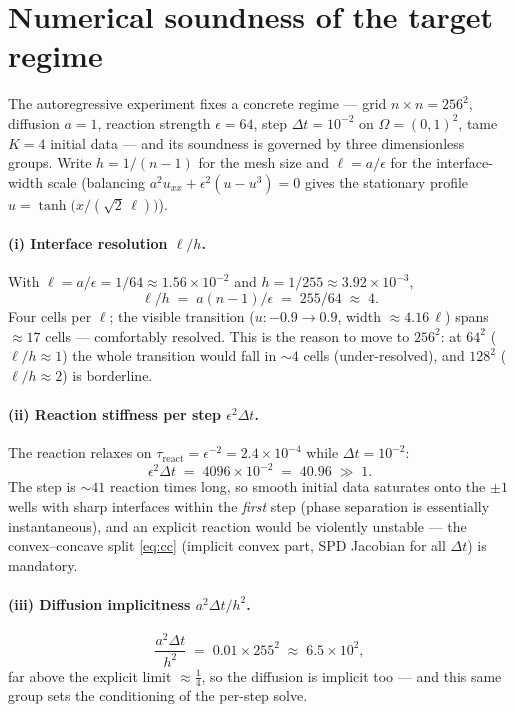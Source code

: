 \documentclass[11pt]{article}
\newcommand{\dt}{\Delta t}
\begin{document}
\section{Numerical soundness of the target regime}
\label{sec:regime}

The autoregressive experiment fixes a concrete regime --- grid $n\times n=256^2$, diffusion
$a=1$, reaction strength $\epsilon=64$, step $\dt=10^{-2}$ on $\Omega=(0,1)^2$, tame $K=4$
initial data --- and its soundness is governed by three dimensionless groups. Write
$h=1/(n-1)$ for the mesh size and $\ell=a/\epsilon$ for the interface-width scale (balancing
$a^2u_{xx}+\epsilon^2(u-u^3)=0$ gives the stationary profile $u=\tanh\!\big(x/(\sqrt2\,\ell)\big)$).

\paragraph{(i) Interface resolution $\ell/h$.}
With $\ell=a/\epsilon=1/64\approx1.56\times10^{-2}$ and $h=1/255\approx3.92\times10^{-3}$,
\[
  \ell/h \;=\; a(n-1)/\epsilon \;=\; 255/64 \;\approx\; 4 .
\]
Four cells per $\ell$; the visible transition ($u:-0.9\!\to\!0.9$, width $\approx4.16\,\ell$)
spans $\approx17$ cells --- comfortably resolved. This is the reason to move to $256^2$: at
$64^2$ ($\ell/h\approx1$) the whole transition would fall in $\sim4$ cells (under-resolved), and
$128^2$ ($\ell/h\approx2$) is borderline.

\paragraph{(ii) Reaction stiffness per step $\epsilon^2\dt$.}
The reaction relaxes on $\tau_{\mathrm{react}}=\epsilon^{-2}=2.4\times10^{-4}$ while $\dt=10^{-2}$:
\[
  \epsilon^2\dt \;=\; 4096\times10^{-2}\;=\;40.96\;\gg\;1 .
\]
The step is $\sim41$ reaction times long, so smooth initial data saturates onto the $\pm1$ wells
with sharp interfaces within the \emph{first} step (phase separation is essentially instantaneous),
and an explicit reaction would be violently unstable --- the convex--concave split \eqref{eq:cc}
(implicit convex part, SPD Jacobian for all $\dt$) is mandatory.

\paragraph{(iii) Diffusion implicitness $a^2\dt/h^2$.}
\[
  \frac{a^2\dt}{h^2}\;=\;0.01\times255^2\;\approx\;6.5\times10^2 ,
\]
far above the explicit limit $\approx\tfrac14$, so the diffusion is implicit too --- and this same
group sets the conditioning of the per-step solve.
\end{document}
